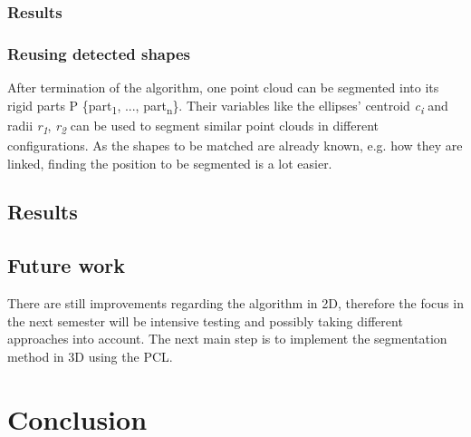\documentclass[a4paper,english,11pt]{report}
\begin{document}
\subsection{Results}

\subsection{Reusing detected shapes}

After termination of the algorithm, one point cloud can be segmented into its rigid parts P \{part\textsubscript{1}, ..., part\textsubscript{n}\}. Their variables like the ellipses' centroid \textit{c\textsubscript{i}} and radii \textit{r\textsubscript{1}}, \textit{r\textsubscript{2}} can be used to segment similar point clouds in different configurations. As the shapes to be matched are already known, e.g. how they are linked, finding the position to be segmented is a lot easier.

\section{Results}

\section{Future work}

There are still improvements regarding the algorithm in 2D, therefore the focus in the next semester will be intensive testing and possibly taking different approaches into account. The next main step is to implement the segmentation method in 3D using the PCL. 





\chapter{Conclusion}



\MakeBibliography[nosplit]
\end{document}
